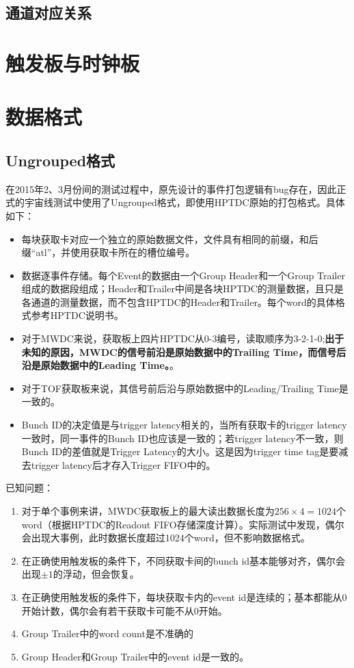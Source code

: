\subsection{通道对应关系}

\section{触发板与时钟板}

\section{数据格式}

\subsection{Ungrouped格式}
在2015年2、3月份间的测试过程中，原先设计的事件打包逻辑有bug存在，因此正式的宇宙线测试中使用了Ungrouped格式，即使用HPTDC原始的打包格式。具体如下：
\begin{itemize}
	\item 每块获取卡对应一个独立的原始数据文件，文件具有相同的前缀，和后缀“atl”，并使用获取卡所在的槽位编号。
	\item 数据逐事件存储。每个Event的数据由一个Group Header和一个Group Trailer组成的数据段组成；Header和Trailer中间是各块HPTDC的测量数据，且只是各通道的测量数据，而不包含HPTDC的Header和Trailer。每个word的具体格式参考HPTDC说明书。
	\item 对于MWDC来说，获取板上四片HPTDC从0-3编号，读取顺序为3-2-1-0;\textbf{出于未知的原因，MWDC的信号前沿是原始数据中的Trailing Time，而信号后沿是原始数据中的Leading Time。}。
	\item 对于TOF获取板来说，其信号前后沿与原始数据中的Leading/Trailing Time是一致的。
	\item Bunch ID的决定值是与trigger latency相关的，当所有获取卡的trigger latency一致时，同一事件的Bunch ID也应该是一致的；若trigger latency不一致，则Bunch ID的差值就是Trigger Latency的大小。这是因为trigger time tag是要减去trigger latency后才存入Trigger FIFO中的。
\end{itemize}

已知问题：
\begin{enumerate}
	\item 对于单个事例来讲，MWDC获取板上的最大读出数据长度为$256\times4=1024$个word（根据HPTDC的Readout FIFO存储深度计算）。实际测试中发现，偶尔会出现大事例，此时数据长度超过1024个word，但不影响数据格式。
	\item 在正确使用触发板的条件下，不同获取卡间的bunch id基本能够对齐，偶尔会出现$\pm 1$的浮动，但会恢复。
	\item 在正确使用触发板的条件下，每块获取卡内的event id是连续的；基本都能从0开始计数，偶尔会有若干获取卡可能不从0开始。
	\item Group Trailer中的word count是不准确的
	\item Group Header和Group Trailer中的event id是一致的。
\end{enumerate}



